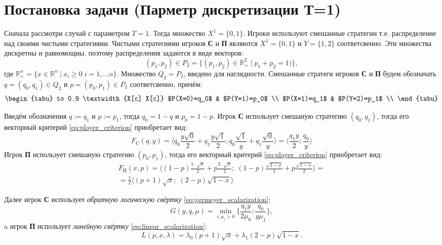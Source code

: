 \section{Постановка задачи (Парметр дискретизации Т=1)}

Сначала рассмотри случай с параметром $T=1$. Тогда множество $X^1=\{0, 1\}$.
Игроки используют смешанные стратегии т.е. распределение над своими чистыми 
стратегиями.
Чистыми стратегиями игроков \textbf{С} и \textbf{П} являются $X^1=\{0, 1\}$ и 
$Y=\{1,2\}$ соответсвенно. Эти множества дискретны и равномощны, поэтому 
распределения задаются в виде векторов: 
$$
	(p_1, p_2) \in P_2 = \{
		(p_1, p_2) \in \mathbb{R}_+^2 \; | \; p_1 + p_2 = 1)
	\},
$$
где $
	\mathbb{R}_+^n = \{ x \in \mathbb{R}^n \: | \: 
	x_i \geqslant 0 \; i = 1, \ldots n\}
$.
Множество $Q_2=P_2$, введено для наглядности. 
Смешанные стратеги игроков \textbf{С} и \textbf{П} будем обозначать
$q=(q_0,q_1) \in Q_2$ и $p=(p_0,p_1) \in P_2$ соответсвенно, причём:
\begin{equation}
	\begin{tabu} to 0.9 \textwidth {X[c] X[c]}
		$P(X=0)=q_0$ & $P(Y=1)=p_0$ \\
		$P(X=1)=q_1$ & $P(Y=2)=p_1$ \\
	\end{tabu}	
	\label{eq:probability_1}
\end{equation}

Введём обозначения $q := q_1$ и $p := p_1$, тогда $q_0 = 1-q$ и $p_0 = 1 - p$. 
Игрок \textbf{С} использует смешаную стратегию  $(q_0,q_1)$, тогда
его векторный критерий \eqref{eq:player_criterion} приобретает вид: 
$$
	F_\textrm{C}(q,y)=
	\big \langle
		q_0\frac{y\sqrt{0}}{2} + 
		q_1\frac{y\sqrt{1}}{2};
		q_0\frac{\sqrt{1}}{y} +
		q_1\frac{\sqrt{0}}{y}
	\big \rangle 
	= 	
	\big \langle
		\frac{q_1y}{2};
		\frac{q_0}{y}
	\big \rangle 
$$
Игрок \textbf{П} использует смешаную стратегию  $(p_0,p_1)$, тогда
его векторный критерий \eqref{eq:player_criterion} приобретает вид: 
\begin{gather*}
	F_\textrm{П}(x,p)=
	\big \langle 
		(1-p)\frac{1 \cdot \sqrt{x}}{2} + p \frac{2 \cdot \sqrt{x}}{2}; \;
		(1-p)\frac{\sqrt{1-x}}{1}+p\frac{\sqrt{1-x}}{2} 
	\big \rangle=
	\\
	=\frac{1}{2}
	\big \langle
		(p+1)\sqrt{x}; \;
		(2-p)\sqrt{1-x}
	\big \rangle
\end{gather*}

Далее игрок \textbf{С} использует \textit{обратную логическую свёртку}
\eqref{eq:germeyer_scalarization}:
$$
	G(y, q, \mu) = 
	\min \limits_{i: \mu_i > 0} \{\frac{q_1y}{2\mu_0};\frac{q_0}{y\mu_1}\},
$$
a игрок \textbf{П} использует \textit{линейную свёртку}
\eqref{eq:linear_scalarization}:
$$
	L(p, x, \lambda) = 
	\lambda_0 (p+1)\sqrt{x} + \lambda_1 (2-p)\sqrt{1-x}.
$$

